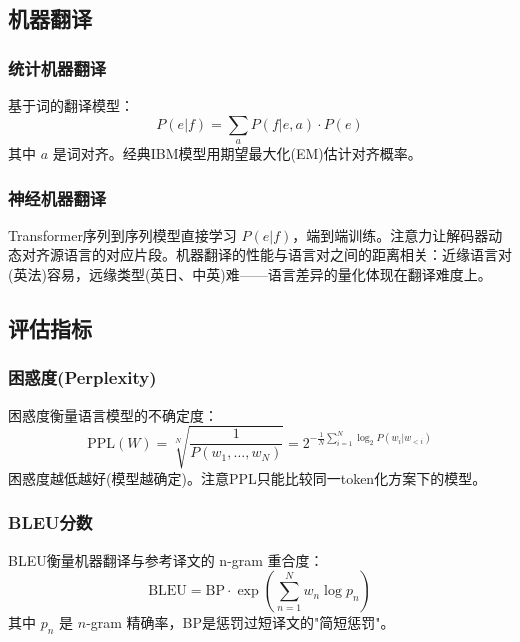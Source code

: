 \subsection{机器翻译}

\subsubsection{统计机器翻译}

基于词的翻译模型：
\begin{equation}
    P(e | f) = \sum_{a} P(f | e, a) \cdot P(e)
\end{equation}
其中 $a$ 是词对齐。经典IBM模型用期望最大化(EM)估计对齐概率。

\subsubsection{神经机器翻译}

Transformer序列到序列模型直接学习 $P(e|f)$，端到端训练。注意力让解码器动态对齐源语言的对应片段。机器翻译的性能与语言对之间的距离相关：近缘语言对(英法)容易，远缘类型(英日、中英)难——语言差异的量化体现在翻译难度上。

\subsection{评估指标}

\subsubsection{困惑度(Perplexity)}

困惑度衡量语言模型的不确定度：
\begin{equation}
    \text{PPL}(W) = \sqrt[N]{\frac{1}{P(w_1, \ldots, w_N)}} = 2^{-\frac{1}{N}\sum_{i=1}^{N}\log_2 P(w_i | w_{<i})}
\end{equation}
困惑度越低越好(模型越确定)。注意PPL只能比较同一token化方案下的模型。

\subsubsection{BLEU分数}

BLEU衡量机器翻译与参考译文的 n-gram 重合度：
\begin{equation}
    \text{BLEU} = \text{BP} \cdot \exp\left(\sum_{n=1}^{N} w_n \log p_n\right)
\end{equation}
其中 $p_n$ 是 $n$-gram 精确率，BP是惩罚过短译文的"简短惩罚"。

